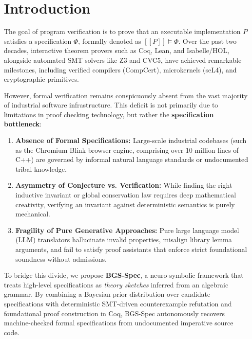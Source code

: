 \documentclass[10pt,journal,compsoc]{IEEEtran}
\newcommand{\llbracket}{[\![}
\newcommand{\rrbracket}{]\!]}
\begin{document}
\maketitle
\IEEEdisplaynontitleabstractindextext
\IEEEpeerreviewmaketitle

\section{Introduction}

The goal of program verification is to prove that an executable implementation $P$ satisfies a specification $\Phi$, formally denoted as $\llbracket P \rrbracket \models \Phi$. Over the past two decades, interactive theorem provers such as Coq, Lean, and Isabelle/HOL, alongside automated SMT solvers like Z3 and CVC5, have achieved remarkable milestones, including verified compilers (CompCert), microkernels (seL4), and cryptographic primitives.

However, formal verification remains conspicuously absent from the vast majority of industrial software infrastructure. This deficit is not primarily due to limitations in proof checking technology, but rather the \textbf{specification bottleneck}:
\begin{enumerate}
    \item \textbf{Absence of Formal Specifications:} Large-scale industrial codebases (such as the Chromium Blink browser engine, comprising over 10 million lines of C++) are governed by informal natural language standards or undocumented tribal knowledge.
    \item \textbf{Asymmetry of Conjecture vs. Verification:} While finding the right inductive invariant or global conservation law requires deep mathematical creativity, verifying an invariant against deterministic semantics is purely mechanical.
    \item \textbf{Fragility of Pure Generative Approaches:} Pure large language model (LLM) translators hallucinate invalid properties, misalign library lemma arguments, and fail to satisfy proof assistants that enforce strict foundational soundness without admissions.
\end{enumerate}

To bridge this divide, we propose \textbf{BGS-Spec}, a neuro-symbolic framework that treats high-level specifications as \emph{theory sketches} inferred from an algebraic grammar. By combining a Bayesian prior distribution over candidate specifications with deterministic SMT-driven counterexample refutation and foundational proof construction in Coq, BGS-Spec autonomously recovers machine-checked formal specifications from undocumented imperative source code.
\end{document}
